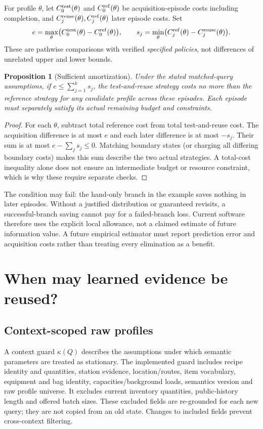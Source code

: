 \documentclass[11pt]{article}
\newtheorem{proposition}[theorem]{Proposition}
\theoremstyle{definition}
\begin{document}
For profile $\theta$, let $C_{0}^{\rm test}(\theta)$ and
$C_{0}^{\rm ref}(\theta)$ be acquisition-episode costs including completion, and
$C_j^{\rm reuse}(\theta),C_j^{\rm ref}(\theta)$ later episode costs.
Set
\[
 e=\max_{\theta}\bigl(C_0^{\rm test}(\theta)-C_0^{\rm ref}(\theta)\bigr),
 \qquad
 s_j=\min_{\theta}\bigl(C_j^{\rm ref}(\theta)-C_j^{\rm reuse}(\theta)\bigr).
\]
These are pathwise comparisons with verified \emph{specified policies}, not
differences of unrelated upper and lower bounds.
\begin{proposition}[Sufficient amortization]\label{prop:amortize}
Under the stated matched-query assumptions, if $e\leq\sum_{j=1}^k s_j$, the
test-and-reuse strategy costs no more than the reference strategy for any
candidate profile across these episodes. Each episode must separately satisfy
its actual remaining budget and constraints.
\end{proposition}
\begin{proof}
For each $\theta$, subtract total reference cost from total test-and-reuse cost.
The acquisition difference is at most $e$ and each later difference is at most
$-s_j$. Their sum is at most $e-\sum_j s_j\leq0$. Matching boundary states (or
charging all differing boundary costs) makes this sum describe the two actual
strategies. A total-cost inequality alone does not ensure an intermediate
budget or resource constraint, which is why these require separate checks.
\end{proof}
The condition may fail: the hand-only branch in the example saves nothing in
later episodes. Without a justified distribution or guaranteed revisits, a
successful-branch saving cannot pay for a failed-branch loss. Current software
therefore uses the explicit local allowance, not a claimed estimate of future
information value. A future empirical estimator must report prediction error
and acquisition costs rather than treating every elimination as a benefit.

\section{When may learned evidence be reused?}
\subsection{Context-scoped raw profiles}
A context guard $\kappa(Q)$ describes the assumptions under which semantic
parameters are treated as stationary. The implemented guard includes recipe
identity and quantities, station evidence, location/routes, item vocabulary,
equipment and bag identity, capacities/background loads, semantics version and
raw profile universe. It excludes current inventory quantities, public-history
length and offered batch sizes. These excluded fields are re-grounded for each
new query; they are not copied from an old state. Changes to included fields
prevent cross-context filtering.
\end{document}
